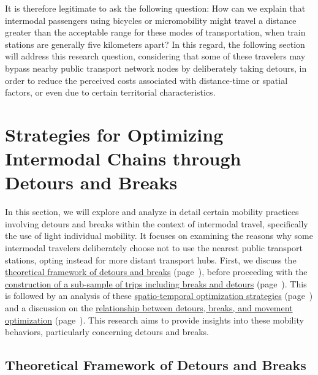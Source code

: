 \begin{refsegment}
It is therefore legitimate to ask the following question: How can we explain that intermodal passengers using bicycles or micromobility might travel a distance greater than the acceptable range for these modes of transportation, when train stations are generally five kilometers apart? In this regard, the following section will address this research question, considering that some of these travelers may bypass nearby public transport network nodes by deliberately taking detours, in order to reduce the perceived costs associated with distance-time or spatial factors, or even due to certain territorial characteristics.%

\newpage
{} %
\section{Strategies for Optimizing Intermodal Chains through Detours and Breaks
    \label{chap5:detours-pauses-optimisation}
}

In this section, we will explore and analyze in detail certain mobility practices involving detours and breaks within the context of intermodal travel, specifically the use of light individual mobility. It focuses on examining the reasons why some intermodal travelers deliberately choose not to use the nearest public transport stations, opting instead for more distant transport hubs. First, we discuss the \hyperref[chap5:enjeux-detours-pauses]{theoretical framework of detours and breaks} (page~\pageref{chap5:enjeux-detours-pauses}), before proceeding with the \hyperref[chap5:methodes-statistiques]{construction of a sub-sample of trips including breaks and detours} (page~\pageref{chap5:methodes-statistiques}). This is followed by an analysis of these \hyperref[chap5:strategies-optimisation]{spatio-temporal optimization strategies} (page~\pageref{chap5:strategies-optimisation}) and a discussion on the \hyperref[chap5:discussion-detours-pauses-optimisation]{relationship between detours, breaks, and movement optimization} (page~\pageref{chap5:discussion-detours-pauses-optimisation}). This research aims to provide insights into these mobility behaviors, particularly concerning detours and breaks.%

\subsection{Theoretical Framework of Detours and Breaks
    \label{chap5:enjeux-detours-pauses}
}


\end{refsegment}
